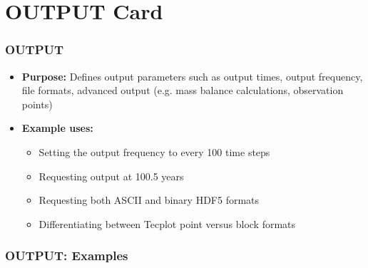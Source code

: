 \section{OUTPUT Card}

\begin{frame}\frametitle{OUTPUT}

\begin{itemize}
\item[] \textbf{Purpose:} Defines output parameters such as output times, output frequency, file formats, advanced output (e.g. mass balance calculations, observation points)
\item[] \textbf{Example uses:}
\begin{itemize}
  \item Setting the output frequency to every 100 time steps
  \item Requesting output at 100.5 years
  \item Requesting both ASCII and binary HDF5 formats
  \item Differentiating between Tecplot point versus block formats
\end{itemize}
\end{itemize}

\end{frame}

\begin{frame}[fragile]\frametitle{OUTPUT: Examples}

\end{frame}

